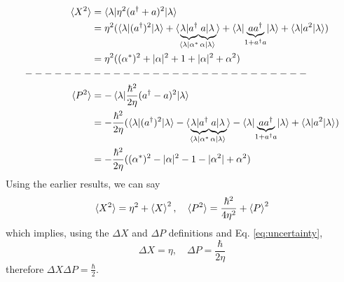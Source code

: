 \documentclass{article}
\theoremstyle{definition}
\theoremstyle{remark}
\begin{document}
\begin{align*}
    \braket{X^2} &= \braket{\lambda|\eta^2(a^\dagger+a)^2|\lambda}\\
                 &= \eta^2(\braket{\lambda|(a^\dagger)^2|\lambda}+\braket{\underset{\bra{\lambda}\alpha^*}{\underbrace{\lambda|a^\dagger}} \underset{\alpha\ket{\lambda}}{\underbrace{a|\lambda}}}+\braket{\lambda|\underset{1+a^\dagger a}{\underbrace{aa^\dagger}}|\lambda}+\braket{\lambda|a^2|\lambda})\\
                 &= \eta^2((\alpha^*)^2 + |\alpha|^2 + 1 + |\alpha|^2 + \alpha^2)\\
    -------&----------------------\\
    \braket{P^2} &= -\braket{\lambda|\frac{\hbar^2}{2\eta}(a^\dagger-a)^2|\lambda}\\
                 &= -\frac{\hbar^2}{2\eta}(\braket{\lambda|(a^\dagger)^2|\lambda}-\braket{\underset{\bra{\lambda}\alpha^*}{\underbrace{\lambda|a^\dagger}} \underset{\alpha\ket{\lambda}}{\underbrace{a|\lambda}}}-\braket{\lambda|\underset{1+a^\dagger a}{\underbrace{aa^\dagger}}|\lambda}+\braket{\lambda|a^2|\lambda})\\
                 &= -\frac{\hbar^2}{2\eta}((\alpha^*)^2 - |\alpha|^2 - 1 -|\alpha^2| +\alpha^2)
\end{align*}
Using the earlier results, we can say
\begin{equation}
    \braket{X^2} = \eta^2+\braket{X}^2, \quad \braket{P^2} = \frac{\hbar^2}{4\eta^2}+\braket{P}^2
\end{equation}
which implies, using the $\Delta X$ and $\Delta P$ definitions and Eq. \ref{eq:uncertainty},
\begin{equation*}
    \Delta X = \eta, \quad \Delta P = \frac{\hbar}{2\eta}
\end{equation*}
therefore $\Delta X\Delta P = \frac{\hbar}{2}$.
\end{document}
